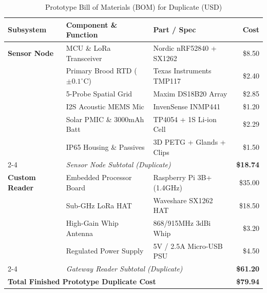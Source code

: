 \documentclass[10pt,conference,letterpaper]{IEEEtran}
\begin{document}
\begin{table}[!t]
\caption{Prototype Bill of Materials (BOM) for Duplicate (USD)}
\label{tab:bom}
\centering
\setlength{\tabcolsep}{1.8pt}
\scriptsize
\begin{tabular}{@{}p{1.65cm}p{2.95cm}p{2.35cm}r@{}}
\toprule
\textbf{Subsystem} & \textbf{Component \& Function} & \textbf{Part / Spec} & \textbf{Cost} \\ \midrule
\textbf{Sensor Node} & MCU \& LoRa Transceiver & Nordic nRF52840 + SX1262 & \$8.50 \\
& Primary Brood RTD ($\pm 0.1^\circ\text{C}$) & Texas Instruments TMP117 & \$2.40 \\
& 5-Probe Spatial Grid & Maxim DS18B20 Array & \$2.85 \\
& I2S Acoustic MEMS Mic & InvenSense INMP441 & \$1.20 \\
& Solar PMIC \& 3000mAh Batt & TP4054 + 1S Li-ion Cell & \$2.29 \\
& IP65 Housing \& Passives & 3D PETG + Glands + Clips & \$1.50 \\
\cmidrule(l){2-4}
& \multicolumn{2}{l}{\textit{Sensor Node Subtotal (Duplicate)}} & \textbf{\$18.74} \\ \midrule
\textbf{Custom Reader} & Embedded Processor Board & Raspberry Pi 3B+ (1.4GHz) & \$35.00 \\
& Sub-GHz LoRa HAT & Waveshare SX1262 HAT & \$18.50 \\
& High-Gain Whip Antenna & 868/915MHz 3dBi Whip & \$3.20 \\
& Regulated Power Supply & 5V / 2.5A Micro-USB PSU & \$4.50 \\
\cmidrule(l){2-4}
& \multicolumn{2}{l}{\textit{Gateway Reader Subtotal (Duplicate)}} & \textbf{\$61.20} \\ \midrule
\multicolumn{3}{l}{\textbf{Total Finished Prototype Duplicate Cost}} & \textbf{\$79.94} \\ \bottomrule
\end{tabular}
\end{table}
\end{document}

